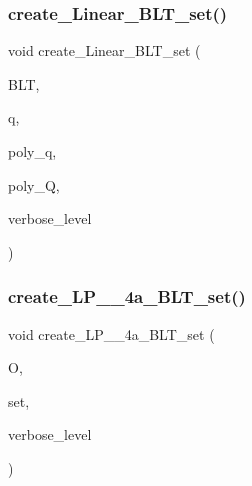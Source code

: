 \subsubsection{\texorpdfstring{create\+\_\+\+Linear\+\_\+\+B\+L\+T\+\_\+set()}{create\_Linear\_BLT\_set()}}
{\footnotesize\ttfamily void create\+\_\+\+Linear\+\_\+\+B\+L\+T\+\_\+set (\begin{DoxyParamCaption}\item[{\mbox{\hyperlink{galois_8h_a09fddde158a3a20bd2dcadb609de11dc}{I\+NT}} $\ast$}]{B\+LT,  }\item[{\mbox{\hyperlink{galois_8h_a09fddde158a3a20bd2dcadb609de11dc}{I\+NT}}}]{q,  }\item[{const \mbox{\hyperlink{galois_8h_ab6cc7b4aeb6ea31aba2b3fbfc83ff5e6}{B\+Y\+TE}} $\ast$}]{poly\+\_\+q,  }\item[{const \mbox{\hyperlink{galois_8h_ab6cc7b4aeb6ea31aba2b3fbfc83ff5e6}{B\+Y\+TE}} $\ast$}]{poly\+\_\+Q,  }\item[{\mbox{\hyperlink{galois_8h_a09fddde158a3a20bd2dcadb609de11dc}{I\+NT}}}]{verbose\+\_\+level }\end{DoxyParamCaption})}

\mbox{\label{data_8_c_a86a580c0a59cf2d3e86e8ed7a79d3f30}} 
\subsubsection{\texorpdfstring{create\+\_\+\+L\+P\+\_\+\_\+4a\+\_\+\+B\+L\+T\+\_\+set()}{create\_LP\_37\_4a\_BLT\_set()}}
{\footnotesize\ttfamily void create\+\_\+\+L\+P\+\_\+\_\+4a\+\_\+\+B\+L\+T\+\_\+set (\begin{DoxyParamCaption}\item[{\mbox{\hyperlink{classorthogonal}{orthogonal}} $\ast$}]{O,  }\item[{\mbox{\hyperlink{galois_8h_a09fddde158a3a20bd2dcadb609de11dc}{I\+NT}} $\ast$}]{set,  }\item[{\mbox{\hyperlink{galois_8h_a09fddde158a3a20bd2dcadb609de11dc}{I\+NT}}}]{verbose\+\_\+level }\end{DoxyParamCaption})}

\mbox{\label{data_8_c_abf607dbfad61b59dcaf3f05bf62fb2a0}} 

